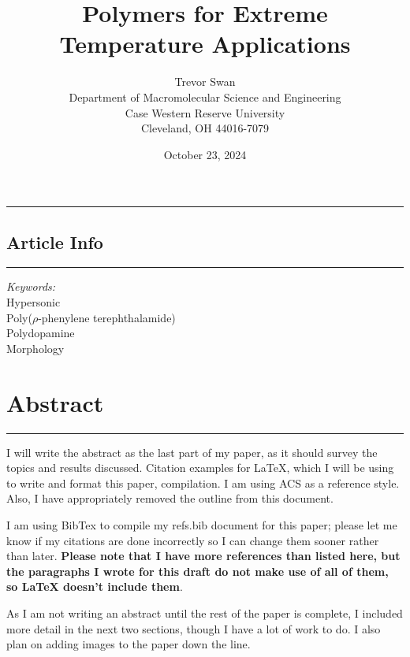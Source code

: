 \documentclass[12pt]{article}
\title{\textbf{Polymers for Extreme Temperature Applications}}
\author{Trevor Swan \\
Department of Macromolecular Science and Engineering \\ 
Case Western Reserve University \\
Cleveland, OH 44016-7079}
\date{October 23, 2024}
\begin{document}
\maketitle

\hrule height 1pt
\vspace{1em}

\noindent %
\begin{minipage}[t]{0.2\textwidth}
    \subsection*{Article Info}
    \vspace{-0.5em}
    \hrule height 1pt
    \vspace{0.5em}
    \textit{Keywords:}\\
    	Hypersonic\\
        Poly($\rho$-phenylene terephthalamide)\\
        Polydopamine\\
    	Morphology
\end{minipage}%
\hfill %
\begin{minipage}[t]{0.75\textwidth}
    \section*{Abstract}
    \vspace{-0.97em}
    \hrule height 1pt
    \vspace{0.5em}
    
    \indent I will write the abstract as the last part of my paper, as it should survey the topics and results discussed. Citation examples for LaTeX, which I will be using to write and format this paper, compilation. I am using ACS as a reference style. Also, I have appropriately removed the outline from this document.

    \indent I am using BibTex to compile my refs.bib document for this paper; please let me know if my citations are done incorrectly so I can change them sooner rather than later. \textbf{Please note that I have more references than listed here, but the paragraphs I wrote for this draft do not make use of all of them, so LaTeX doesn't include them}.
        
    \indent As I am not writing an abstract until the rest of the paper is complete, I included more detail in the next two sections, though I have a lot of work to do. I also plan on adding images to the paper down the line.
\end{minipage}
\end{document}
